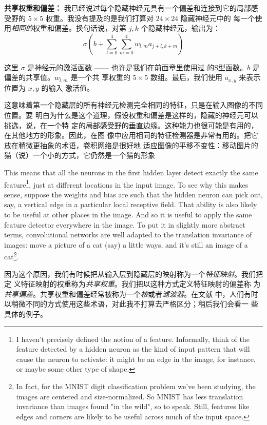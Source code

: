 \textbf{共享权重和偏差：} 我已经说过每个隐藏神经元具有一个偏差和连接到它的局部感
受野的 $5 \times 5$ 权重。我没有提及的是我们打算对 $24 \times 24$ 隐藏神经元中的
每一个使用\emph{相同的}权重和偏差。换句话说，对第 $j, k$ 个隐藏神经元，输出为：
\begin{equation}
  \sigma\left(b + \sum_{l=0}^4 \sum_{m=0}^4  w_{l,m} a_{j+l, k+m} \right)
  \label{eq:125}\tag{125}
\end{equation}

这里 $\sigma$ 是神经元的激活函数 —— 也许是我们在前面章里使用过
的\hyperref[sec:sigmoid_neurons]{S型函数}。$b$ 是偏差的共享值。$w_{l,m}$ 是一个共
享权重的 $5 \times 5$ 数组。最后，我们使用 $a_{x, y}$ 来表示位置为 $x, y$ 的输入
激活值。

这意味着第一个隐藏层的所有神经元检测完全相同的特征，只是在输入图像的不同位置。要
明白为什么是这个道理，假设权重和偏差是这样的，隐藏的神经元可以挑选，说，在一个特
定的局部感受野的垂直边缘。这种能力也很可能是有用的，在其他地方的形象。因此，在图
像中应用相同的特征检测器是非常有用的。把它放在稍微更抽象的术语，卷积网络是很好地
适应图像的平移不变性：移动图片的猫（说）一个小的方式，它仍然是一个猫的形象

This means that all the neurons in the first hidden layer detect exactly the
same feature\footnote{I haven't precisely defined the notion of a
  feature. Informally, think of the feature detected by a hidden neuron as the
  kind of input pattern that will cause the neuron to activate: it might be an
  edge in the image, for instance, or maybe some other type of shape.}, just at
different locations in the input image. To see why this makes sense, suppose the
weights and bias are such that the hidden neuron can pick out, say, a vertical
edge in a particular local receptive field. That ability is also likely to be
useful at other places in the image. And so it is useful to apply the same
feature detector everywhere in the image. To put it in slightly more abstract
terms, convolutional networks are well adapted to the translation invariance of
images: move a picture of a cat (say) a little ways, and it's still an image of
a cat\footnote{In fact, for the MNIST digit classification problem we've been
  studying, the images are centered and size-normalized. So MNIST has less
  translation invariance than images found "in the wild", so to speak. Still,
  features like edges and corners are likely to be useful across much of the
  input space.}.

因为这个原因，我们有时候把从输入层到隐藏层的映射称为一个\emph{特征映射}。我们把定
义特征映射的权重称为\emph{共享权重}。我们把以这种方式定义特征映射的偏差称
为\emph{共享偏差}。共享权重和偏差经常被称为一个\emph{核}或者\emph{滤波器}。在文献
中，人们有时以稍微不同的方式使用这些术语，对此我不打算去严格区分；稍后我们会看一
些具体的例子。


